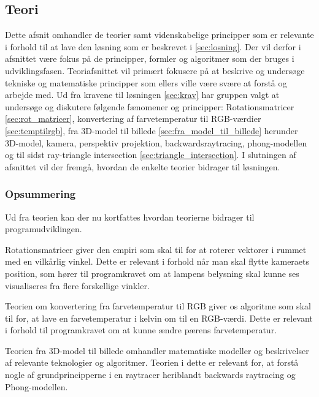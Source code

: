 \subsection{Teori}
\label{sec:teori}

Dette afsnit omhandler de teorier samt videnskabelige principper som er relevante i forhold til at lave den løsning som er beskrevet i \ref{sec:losning}. Der vil derfor i afsnittet være fokus på de principper, formler og algoritmer som der bruges i udviklingsfasen. Teoriafsnittet vil primært fokusere på at beskrive og undersøge tekniske og matematiske principper som ellers ville være svære at forstå og arbejde med. Ud fra kravene til løsningen \ref{sec:krav} har gruppen valgt at undersøge og diskutere følgende fænomener og principper: Rotationsmatricer \ref{sec:rot_matricer}, konvertering af farvetemperatur til RGB-værdier \ref{sec:temptilrgb}, fra 3D-model til billede \ref{sec:fra_model_til_billede} herunder 3D-model, kamera, perspektiv projektion, backwardsraytracing, phong-modellen og til sidst ray-triangle intersection \ref{sec:triangle_intersection}. I slutningen af afsnittet vil der fremgå, hvordan de enkelte teorier bidrager til løsningen.









\subsubsection*{Opsummering}

Ud fra teorien kan der nu kortfattes hvordan teorierne bidrager til programudviklingen. 

Rotationsmatricer giver den empiri som skal til for at roterer vektorer i rummet med en vilkårlig vinkel. Dette er relevant i forhold når man skal flytte kameraets position, som hører til programkravet om at lampens belysning skal kunne ses visualiseres fra flere forskellige vinkler.

Teorien om konvertering fra farvetemperatur til RGB giver os algoritme som skal til for, at lave en farvetemperatur i kelvin om til en RGB-værdi. Dette er relevant i forhold til programkravet om at kunne ændre pærens farvetemperatur. 

Teorien fra 3D-model til billede omhandler matematiske modeller og beskrivelser af relevante teknologier og algoritmer. Teorien i dette er relevant for, at forstå nogle af grundprincipperne i en raytracer heriblandt backwards raytracing og Phong-modellen.

